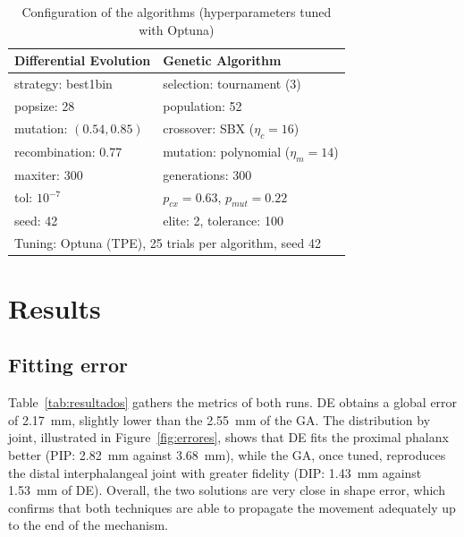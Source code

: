 \documentclass[conference]{IEEEtran}
\begin{document}
\begin{table}[htbp]
\caption{Configuration of the algorithms (hyperparameters tuned with Optuna)}
\begin{center}
\begin{tabular}{|l|l|}
\hline
\textbf{Differential Evolution} & \textbf{Genetic Algorithm} \\
\hline
strategy: best1bin & selection: tournament (3) \\
\hline
popsize: 28 & population: 52 \\
\hline
mutation: $(0.54,0.85)$ & crossover: SBX ($\eta_c=16$) \\
\hline
recombination: 0.77 & mutation: polynomial ($\eta_m=14$) \\
\hline
maxiter: 300 & generations: 300 \\
\hline
tol: $10^{-7}$ & $p_{cx}=0.63$, $p_{mut}=0.22$ \\
\hline
seed: 42 & elite: 2, tolerance: 100 \\
\hline
\multicolumn{2}{|l|}{Tuning: Optuna (TPE), 25 trials per algorithm, seed 42} \\
\hline
\end{tabular}
\label{tab:config}
\end{center}
\end{table}

\section{Results}
\subsection{Fitting error}
Table~\ref{tab:resultados} gathers the metrics of both runs. DE obtains a global
error of 2.17~mm, slightly lower than the 2.55~mm of the GA. The distribution by
joint, illustrated in Figure~\ref{fig:errores}, shows that DE fits the proximal
phalanx better (PIP: 2.82~mm against 3.68~mm), while the GA, once tuned,
reproduces the distal interphalangeal joint with greater fidelity (DIP: 1.43~mm
against 1.53~mm of DE). Overall, the two solutions are very close in shape error,
which confirms that both techniques are able to propagate the movement adequately
up to the end of the mechanism.
\end{document}
